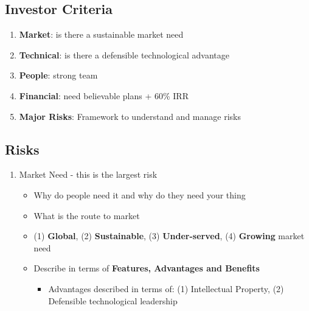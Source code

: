 \documentclass{article}
\begin{document}
\begin{multicols}{2}
\subsection{Investor Criteria}
\begin{enumerate}
    \item \textbf{Market}: is there a sustainable market need
    \item \textbf{Technical}: is there a defensible technological advantage
    \item \textbf{People}: strong team
    \item \textbf{Financial}: need believable plans + 60\% IRR
    \item \textbf{Major Risks}: Framework to understand and manage risks
\end{enumerate}

\subsection{Risks}
\begin{enumerate}
    \item Market Need - this is the largest risk
    \begin{itemize}
        \item Why do people need it and why do they need your thing
        \item What is the route to market
        \item (1) \textbf{Global}, (2) \textbf{Sustainable}, (3) \textbf{Under-served}, (4) \textbf{Growing} market need
        \item Describe in terms of \textbf{Features, Advantages and Benefits}
        \begin{itemize}
            \item Advantages described in terms of: (1) Intellectual Property, (2) Defensible technological leadership
        \end{itemize}
    \end{itemize}
\end{enumerate}


\end{multicols}
\end{document}
